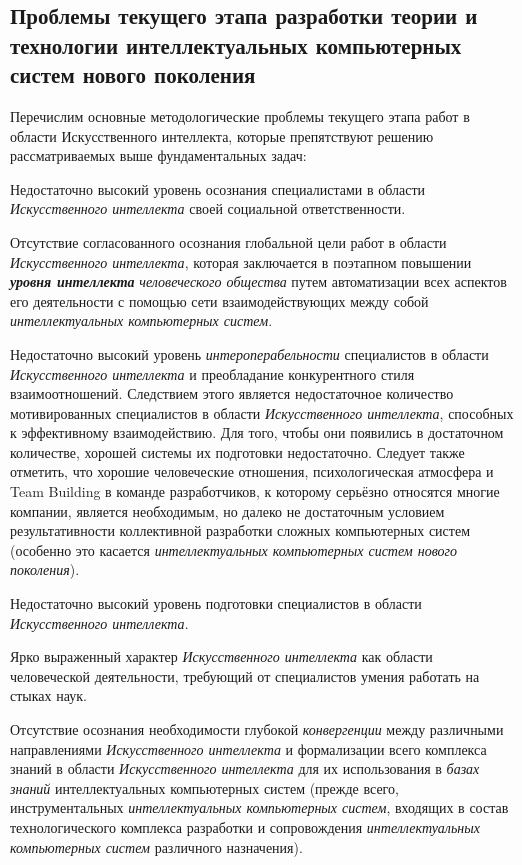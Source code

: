 \subsection*{Проблемы текущего этапа разработки теории и технологии интеллектуальных компьютерных систем нового поколения}
Перечислим основные методологические проблемы текущего этапа работ в области Искусственного интеллекта, которые препятствуют решению рассматриваемых выше фундаментальных задач:
\begin{textitemize}
	\item 
	Недостаточно высокий уровень осознания специалистами в области \textit{Искусственного интеллекта} своей социальной ответственности.
	\medskip
	\item 
	Отсутствие согласованного осознания глобальной цели работ в области \textit{Искусственного интеллекта}, которая заключается в поэтапном повышении \textbf{\textit{уровня интеллекта}} \textit{человеческого общества} путем  автоматизации всех аспектов его деятельности с помощью сети взаимодействующих между собой \textit{интеллектуальных компьютерных систем}.
	\medskip
	\item 
	Недостаточно высокий уровень \textit{интероперабельности} специалистов в области \textit{Искусственного интеллекта} и преобладание конкурентного стиля взаимоотношений. Следствием этого является недостаточное количество мотивированных специалистов в области \textit{Искусственного интеллекта}, способных к эффективному  взаимодействию. Для того, чтобы они появились в достаточном количестве, хорошей системы их  подготовки недостаточно. Следует также отметить, что хорошие человеческие отношения, психологическая атмосфера и Team Building в команде разработчиков, к которому серьёзно относятся многие компании, является необходимым, но далеко не достаточным условием результативности коллективной разработки сложных компьютерных систем (особенно это касается \textit{интеллектуальных компьютерных систем нового поколения}).
	\medskip
	\item 
	Недостаточно высокий уровень  подготовки специалистов в области \textit{Искусственного интеллекта}.
	\medskip
	\item 
	Ярко выраженный  характер \textit{Искусственного интеллекта} как области человеческой деятельности, требующий от специалистов умения работать на стыках наук.
	\medskip
	\item 
	Отсутствие осознания необходимости глубокой \textit{конвергенции} между различными направлениями \textit{Искусственного интеллекта} и формализации всего комплекса знаний в области \textit{Искусственного интеллекта} для их использования в \textit{базах знаний} интеллектуальных компьютерных систем (прежде всего, инструментальных \textit{интеллектуальных компьютерных систем}, входящих в состав технологического комплекса разработки и сопровождения \textit{интеллектуальных компьютерных систем} различного назначения).

\end{textitemize}
